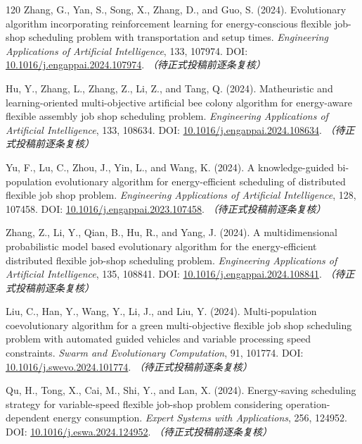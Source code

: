 \documentclass[UTF8,a4paper,11pt]{ctexart}
\begin{document}
\begin{thebibliography}{120}
Zhang, G., Yan, S., Song, X., Zhang, D., and Guo, S. (2024). Evolutionary algorithm incorporating reinforcement learning for energy-conscious flexible job-shop scheduling problem with transportation and setup times. \emph{Engineering Applications of Artificial Intelligence}, 133, 107974.
\newblock DOI: \href{https://doi.org/10.1016/j.engappai.2024.107974}{10.1016/j.engappai.2024.107974}. \textit{（待正式投稿前逐条复核）}

Hu, Y., Zhang, L., Zhang, Z., Li, Z., and Tang, Q. (2024). Matheuristic and learning-oriented multi-objective artificial bee colony algorithm for energy-aware flexible assembly job shop scheduling problem. \emph{Engineering Applications of Artificial Intelligence}, 133, 108634.
\newblock DOI: \href{https://doi.org/10.1016/j.engappai.2024.108634}{10.1016/j.engappai.2024.108634}. \textit{（待正式投稿前逐条复核）}

Yu, F., Lu, C., Zhou, J., Yin, L., and Wang, K. (2024). A knowledge-guided bi-population evolutionary algorithm for energy-efficient scheduling of distributed flexible job shop problem. \emph{Engineering Applications of Artificial Intelligence}, 128, 107458.
\newblock DOI: \href{https://doi.org/10.1016/j.engappai.2023.107458}{10.1016/j.engappai.2023.107458}. \textit{（待正式投稿前逐条复核）}

Zhang, Z., Li, Y., Qian, B., Hu, R., and Yang, J. (2024). A multidimensional probabilistic model based evolutionary algorithm for the energy-efficient distributed flexible job-shop scheduling problem. \emph{Engineering Applications of Artificial Intelligence}, 135, 108841.
\newblock DOI: \href{https://doi.org/10.1016/j.engappai.2024.108841}{10.1016/j.engappai.2024.108841}. \textit{（待正式投稿前逐条复核）}

Liu, C., Han, Y., Wang, Y., Li, J., and Liu, Y. (2024). Multi-population coevolutionary algorithm for a green multi-objective flexible job shop scheduling problem with automated guided vehicles and variable processing speed constraints. \emph{Swarm and Evolutionary Computation}, 91, 101774.
\newblock DOI: \href{https://doi.org/10.1016/j.swevo.2024.101774}{10.1016/j.swevo.2024.101774}. \textit{（待正式投稿前逐条复核）}

Qu, H., Tong, X., Cai, M., Shi, Y., and Lan, X. (2024). Energy-saving scheduling strategy for variable-speed flexible job-shop problem considering operation-dependent energy consumption. \emph{Expert Systems with Applications}, 256, 124952.
\newblock DOI: \href{https://doi.org/10.1016/j.eswa.2024.124952}{10.1016/j.eswa.2024.124952}. \textit{（待正式投稿前逐条复核）}


\end{thebibliography}
\end{document}
